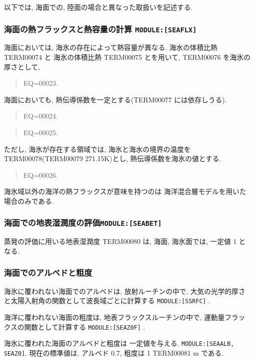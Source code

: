 \bigskip
以下では, 海面での, 陸面の場合と異なった取扱いを記述する.
\bigskip

\subsubsection{海面の熱フラックスと熱容量の計算 \texttt{MODULE:[SEAFLX]}}

海面においては, 海氷の存在によって熱容量が異なる.
海水の体積比熱 TERM00074 と
海氷の体積比熱 TERM00075 とを用いて, TERM00076 を海氷の厚さとして,
\begin{quote}
EQ=00023.
\end{quote}

海面においても, 熱伝導係数を一定とする(TERM00077 には依存しうる).
\begin{quote}
EQ=00024.
\end{quote}
\begin{quote}
EQ=00025.
\end{quote}

ただし, 海氷が存在する領域では, 
海氷と海水の境界の温度を TERM00078(TERM00079 271.15K)とし,
熱伝導係数を海氷の値とする.
\begin{quote}
EQ=00026.
\end{quote}

海氷域以外の海洋の熱フラックスが意味を持つのは
海洋混合層モデルを用いた場合のみである.

\subsubsection{海面での地表湿潤度の評価\texttt{MODULE:[SEABET]}}

蒸発の評価に用いる地表湿潤度 TERM00080 は,
海面, 海氷面では, 一定値 1 となる.

\subsubsection{海面でのアルベドと粗度}


海氷に覆われない海面でのアルベドは, 放射ルーチンの中で,
大気の光学的厚さと太陽入射角の関数として波長域ごとに計算する
\texttt{MODULE:[SSRFC]} .

海洋に覆われない海面の粗度は, 地表フラックスルーチンの中で,
運動量フラックスの関数として計算する
\texttt{MODULE:[SEAZ0F]} .

海氷に覆われた海面のアルベドと粗度は
一定値を与える.
\texttt{MODULE:[SEAALB, SEAZ0]}.
現在の標準値は, アルベド 0.7, 
粗度は 1 TERM00081 m である.

